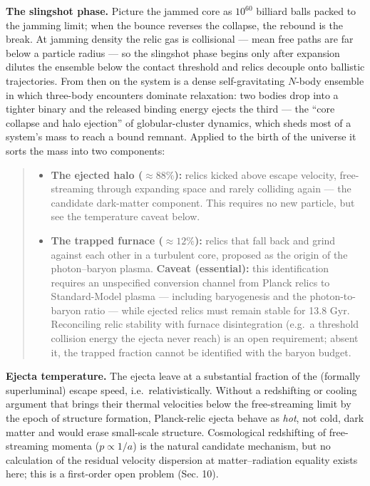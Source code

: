 \documentclass[
]{article}
\providecommand{\tightlist}{%
  \setlength{\itemsep}{0pt}\setlength{\parskip}{0pt}}
\begin{document}
\textbf{The slingshot phase.} Picture the jammed core as \(10^{60}\)
billiard balls packed to the jamming limit; when the bounce reverses the
collapse, the rebound is the break. At jamming density the relic gas is
collisional --- mean free paths are far below a particle radius --- so
the slingshot phase begins only after expansion dilutes the ensemble
below the contact threshold and relics decouple onto ballistic
trajectories. From then on the system is a dense self-gravitating
\(N\)-body ensemble in which three-body encounters dominate relaxation:
two bodies drop into a tighter binary and the released binding energy
ejects the third --- the ``core collapse and halo ejection'' of
globular-cluster dynamics, which sheds most of a system's mass to reach
a bound remnant. Applied to the birth of the universe it sorts the mass
into two components:

\begin{quote}
\begin{itemize}
\tightlist
\item
  \textbf{The ejected halo (\(\approx 88\%\)):} relics kicked above
  escape velocity, free-streaming through expanding space and rarely
  colliding again --- the candidate dark-matter component. This requires
  no new particle, but see the temperature caveat below.
\item
  \textbf{The trapped furnace (\(\approx 12\%\)):} relics that fall back
  and grind against each other in a turbulent core, proposed as the
  origin of the photon--baryon plasma. \textbf{Caveat (essential):} this
  identification requires an unspecified conversion channel from Planck
  relics to Standard-Model plasma --- including baryogenesis and the
  photon-to-baryon ratio --- while ejected relics must remain stable for
  13.8 Gyr. Reconciling relic stability with furnace disintegration
  (e.g.~a threshold collision energy the ejecta never reach) is an open
  requirement; absent it, the trapped fraction cannot be identified with
  the baryon budget.
\end{itemize}
\end{quote}

\textbf{Ejecta temperature.} The ejecta leave at a substantial fraction
of the (formally superluminal) escape speed, i.e.~relativistically.
Without a redshifting or cooling argument that brings their thermal
velocities below the free-streaming limit by the epoch of structure
formation, Planck-relic ejecta behave as \emph{hot}, not cold, dark
matter and would erase small-scale structure. Cosmological redshifting
of free-streaming momenta (\(p \propto 1/a\)) is the natural candidate
mechanism, but no calculation of the residual velocity dispersion at
matter--radiation equality exists here; this is a first-order open
problem (Sec. 10).
\end{document}
